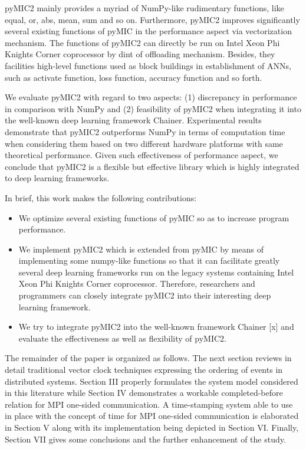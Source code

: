 pyMIC2 mainly provides a myriad of NumPy-like rudimentary functions, like equal, or, abs, mean, sum and so on. Furthermore, pyMIC2 improves significantly several existing functions of pyMIC in the performance aspect via vectorization mechanism. The functions of pyMIC2 can directly be run on Intel Xeon Phi Knights Corner coprocessor by dint of offloading mechanism. Besides, they facilities high-level functions used as block buildings in establishment of ANNs, such as activate function, loss function, accuracy function and so forth.

We evaluate pyMIC2 with regard to two aspects: (1) discrepancy in performance in comparison with NumPy and (2) feasibility of pyMIC2 when integrating it into the well-known deep learning framework Chainer. Experimental results demonstrate that pyMIC2 outperforms NumPy in terms of computation time when considering them based on two different hardware platforms with same theoretical performance. Given such effectiveness of performance aspect, we conclude that pyMIC2 is a flexible but effective library which is highly integrated to deep learning frameworks.

In brief, this work makes the following contributions:
\begin{itemize}
\item We optimize several existing functions of pyMIC so as to increase program performance.
\item We implement pyMIC2 which is extended from pyMIC by means of implementing some numpy-like functions so that it can facilitate greatly several deep learning frameworks run on the legacy systems containing Intel Xeon Phi Knights Corner coprocessor. Therefore, researchers and programmers can closely integrate pyMIC2 into their interesting deep learning framework.
\item We try to integrate pyMIC2 into the well-known framework Chainer [x] and evaluate the effectiveness as well as flexibility of pyMIC2.
\end{itemize}

The remainder of the paper is organized as follows. The next section reviews in detail traditional vector clock techniques expressing the ordering of events in distributed systems. Section III properly formulates the system model considered in this literature while Section IV demonstrates a workable completed-before relation for MPI one-sided communication. A time-stamping system able to use in place with the concept of time for MPI one-sided communication is elaborated in Section V along with its implementation being depicted in Section VI. Finally, Section VII gives some conclusions and the further enhancement of the study.